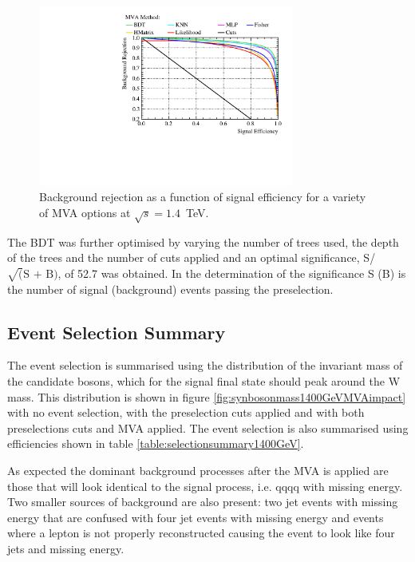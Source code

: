 \begin{figure}
\centering
\includegraphics[width=0.75\textwidth]{PhysicsAnalysis/Plots/MVAPlots/1400GeV/ThesisPlotMVAAlternatives1400GeV.pdf}
\caption[Background rejection as a function of signal efficiency for a variety of MVA options at $\sqrt{s}=1.4$~TeV.]{Background rejection as a function of signal efficiency for a variety of MVA options at $\sqrt{s}=1.4$~TeV.} 
\label{fig:mvaalternatives1400GeV}
\end{figure}

The BDT was further optimised by varying the number of trees used, the depth of the trees and the number of cuts applied and an optimal significance, S/$\sqrt(\text{S + B})$, of 52.7 was obtained.  In the determination of the significance S (B) is the number of signal (background) events passing the preselection.


\subsection{Event Selection Summary}
\label{sec:eventselsummary1400GeV}
The event selection is summarised using the distribution of the invariant mass of the candidate bosons, which for the signal final state should peak around the W mass.  This distribution is shown in figure \ref{fig:synbosonmass1400GeVMVAimpact} with no event selection, with the preselection cuts applied and with both preselections cuts and MVA applied.  The event selection is also summarised using efficiencies shown in table \ref{table:selectionsummary1400GeV}.

As expected the dominant background processes after the MVA is applied are those that will look identical to the signal process, i.e. qqqq with missing energy.  Two smaller sources of background are also present: two jet events with missing energy that are confused with four jet events with missing energy and events where a lepton is not properly reconstructed causing the event to look like four jets and missing energy.  

